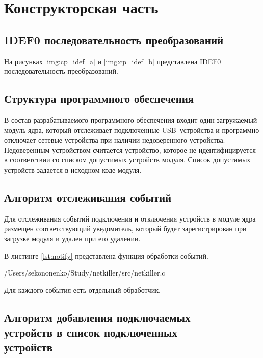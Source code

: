 \chapter{Конструкторская часть}

\section{IDEF0 последовательность преобразований}

На рисунках \ref{img:cp_idef_a} и \ref{img:cp_idef_b} представлена IDEF0 последовательность преобразований.



\section{Структура программного обеспечения}

В состав разрабатываемого программного обеспечения входит один загружаемый модуль ядра, который отслеживает подключенные USB--устройства и программно отключает сетевые устройства при наличии недоверенного устройства. Недоверенным устройством считается устройство, которое не идентифицируется в соответствии со списком допустимых устройств модуля. Список допустимых устройств задается в исходном коде модуля.

\section{Алгоритм отслеживания событий}

Для отслеживания событий подключения и отключения устройств в модуле ядра размещен соответствующий уведомитель, который будет зарегистрирован при загрузке модуля и удален при его удалении.

В листинге \ref{lst:notify} представлена функция обработки событий.

\begin{lstinputlisting}[
	caption={Обработка событий},
	label={lst:notify},
	style={c},
	linerange={168-190},
	]{/Users/sekononenko/Study/netkiller/src/netkiller.c}
\end{lstinputlisting}

Для каждого события есть отдельный обработчик.

\section{Алгоритм добавления подключаемых \\устройств в список подключенных\\ устройств}

